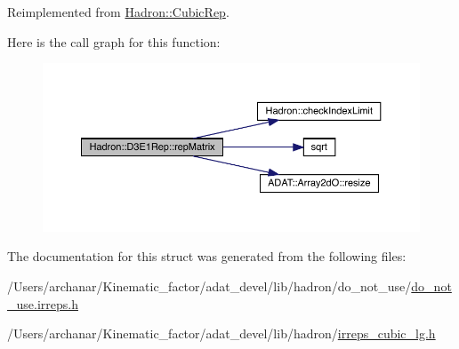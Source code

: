 Reimplemented from \mbox{\hyperlink{structHadron_1_1CubicRep_ac5d7e9e6f4ab1158b5fce3e4ad9e8005}{Hadron\+::\+Cubic\+Rep}}.

Here is the call graph for this function\+:
\nopagebreak
\begin{figure}[H]
\begin{center}
\leavevmode
\includegraphics[width=350pt]{d3/daf/structHadron_1_1D3E1Rep_ac66aebdefbd99d129891c85cbc86b430_cgraph}
\end{center}
\end{figure}


The documentation for this struct was generated from the following files\+:\begin{DoxyCompactItemize}
\item 
/\+Users/archanar/\+Kinematic\+\_\+factor/adat\+\_\+devel/lib/hadron/do\+\_\+not\+\_\+use/\mbox{\hyperlink{do__not__use_8irreps_8h}{do\+\_\+not\+\_\+use.\+irreps.\+h}}\item 
/\+Users/archanar/\+Kinematic\+\_\+factor/adat\+\_\+devel/lib/hadron/\mbox{\hyperlink{lib_2hadron_2irreps__cubic__lg_8h}{irreps\+\_\+cubic\+\_\+lg.\+h}}\end{DoxyCompactItemize}
